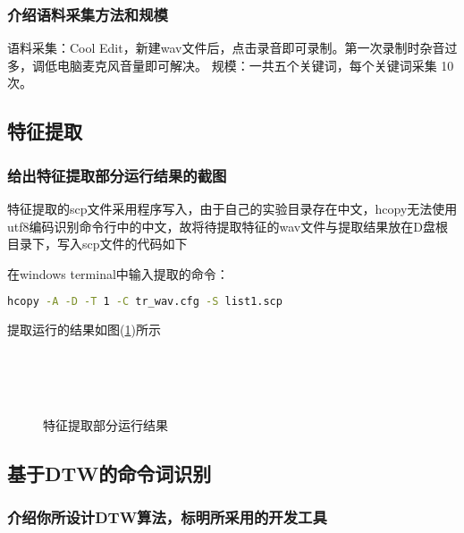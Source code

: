 \documentclass{hitreport}
\begin{document}
\subsubsection{介绍语料采集方法和规模}

语料采集：Cool Edit，新建wav文件后，点击录音即可录制。第一次录制时杂音过多，调低电脑麦克风音量即可解决。
规模：一共五个关键词，每个关键词采集 10 次。

\subsection{特征提取}\label{sec:sec2}

\subsubsection{给出特征提取部分运行结果的截图}

特征提取的scp文件采用程序写入，由于自己的实验目录存在中文，hcopy无法使用utf8编码识别命令行中的中文，故将待提取特征的wav文件与提取结果放在D盘根目录下，写入scp文件的代码如下



在windows terminal中输入提取的命令：
\begin{lstlisting}[language=bash]
hcopy -A -D -T 1 -C tr_wav.cfg -S list1.scp
\end{lstlisting}

提取运行的结果如图(\ref{fig:feature})所示

\begin{figure}[htb]
	\centering
	\\
	\\
	\\
	\caption{特征提取部分运行结果}\label{fig:feature}
\end{figure}

\subsection{基于DTW的命令词识别}\label{sec:sec4}

\subsubsection{介绍你所设计DTW算法，标明所采用的开发工具}
\end{document}

